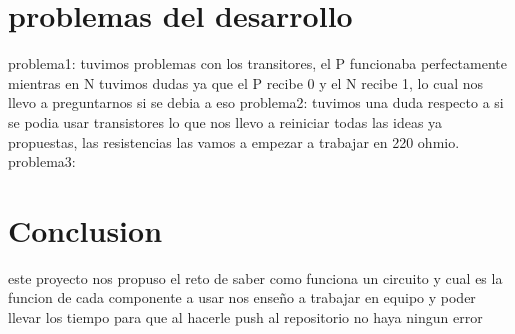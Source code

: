 \documentclass{article}
\begin{document}
\section{problemas del desarrollo}
problema1: tuvimos problemas con los transitores, el P funcionaba perfectamente mientras en N tuvimos dudas ya que el P recibe 0 y el N recibe 1, lo cual nos llevo a preguntarnos si se debia a eso
problema2: tuvimos una duda respecto a si se podia usar transistores lo que nos llevo a reiniciar todas las ideas ya propuestas, las resistencias las vamos a empezar a trabajar en 220 ohmio.
problema3: 
\section{Conclusion}
este proyecto nos propuso el reto de saber como funciona un circuito y cual es la funcion de cada componente a usar
nos enseño a trabajar en equipo y poder llevar los tiempo para que al hacerle push al repositorio no haya ningun error


\end{document}

